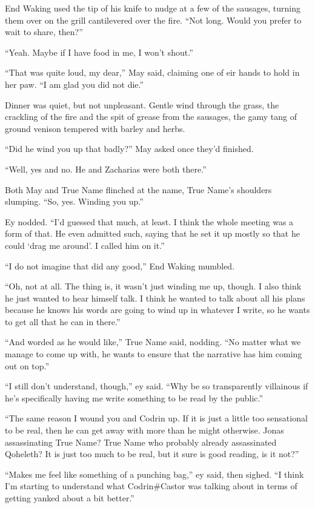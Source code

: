 End Waking used the tip of his knife to nudge at a few of the sausages, turning them over on the grill cantilevered over the fire. ``Not long. Would you prefer to wait to share, then?''

``Yeah. Maybe if I have food in me, I won't shout.''

``That was quite loud, my dear,'' May said, claiming one of eir hands to hold in her paw. ``I am glad you did not die.''

Dinner was quiet, but not unpleasant. Gentle wind through the grass, the crackling of the fire and the spit of grease from the sausages, the gamy tang of ground venison tempered with barley and herbs.

``Did he wind you up that badly?'' May asked once they'd finished.

``Well, yes and no. He and Zacharias were both there.''

Both May and True Name flinched at the name, True Name's shoulders slumping. ``So, yes. Winding you up.''

Ey nodded. ``I'd guessed that much, at least. I think the whole meeting was a form of that. He even admitted such, saying that he set it up mostly so that he could `drag me around'. I called him on it.''

``I do not imagine that did any good,'' End Waking mumbled.

``Oh, not at all. The thing is, it wasn't just winding me up, though. I also think he just wanted to hear himself talk. I think he wanted to talk about all his plans because he knows his words are going to wind up in whatever I write, so he wants to get all that he can in there.''

``And worded as he would like,'' True Name said, nodding. ``No matter what we manage to come up with, he wants to ensure that the narrative has him coming out on top.''

``I still don't understand, though,'' ey said. ``Why be so transparently villainous if he's specifically having me write something to be read by the public.''

``The same reason I wound you and Codrin up. If it is just a little too sensational to be real, then he can get away with more than he might otherwise. Jonas assassinating True Name? True Name who probably already assassinated Qoheleth? It is just too much to be real, but it sure is good reading, is it not?''

``Makes me feel like something of a punching bag,'' ey said, then sighed. ``I think I'm starting to understand what Codrin\#Castor was talking about in terms of getting yanked about a bit better.''

